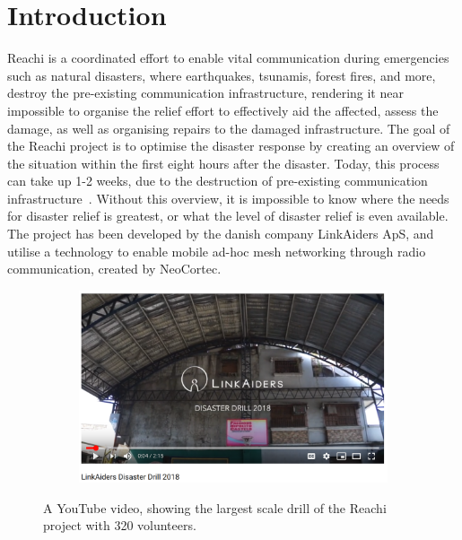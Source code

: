 \chapter{Introduction}

Reachi is a coordinated effort to enable vital communication during emergencies such as natural disasters, where earthquakes, tsunamis, forest fires, and more, destroy the pre-existing communication infrastructure, rendering it near impossible to organise the relief effort to effectively aid the affected, assess the damage, as well as organising repairs to the damaged infrastructure. The goal of the Reachi project is to optimise the disaster response by creating an overview of the situation within the first eight hours after the disaster. Today, this process can take up 1-2 weeks, due to the destruction of pre-existing communication infrastructure~\cite{website:reachiproject}. Without this overview, it is impossible to know where the needs for disaster relief is greatest, or what the level of disaster relief is even available. The project has been developed by the danish company LinkAiders ApS, and utilise a technology to enable mobile ad-hoc mesh networking through radio communication, created by NeoCortec.

\begin{figure}[H]
    \centering
    \begin{subfigure}[]{.2\textwidth}
        \label{figure:clustering:2knodes}
    \end{subfigure}
    \begin{subfigure}[]{.79\textwidth}
        \includegraphics[width=\linewidth]{figures/linkaiders-drill-320.png}
        \label{figure:clustering:2k80m2ptsnodes}
    \end{subfigure}
    \caption{A YouTube video, showing the largest scale drill of the Reachi project with 320 volunteers.}
    \label{figure:introduction:reachi-test}
\end{figure}

